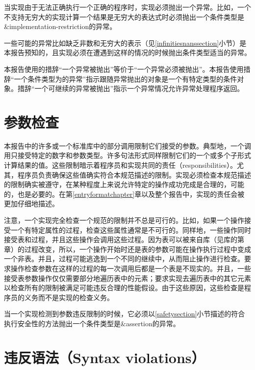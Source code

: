 当实现由于无法正确执行一个正确的程序时，实现必须抛出一个异常。比如，一个不支持无穷大的实现计算一个结果是无穷大的表达式时必须抛出一个条件类型是{\cf\&implementation-restriction}的异常。

一些可能的异常比如缺乏非数和无穷大的表示（见\ref{infinitiesnanssection}小节）是本报告预知的，且实现必须在遭遇到这样的情况的时候抛出条件类型适当的异常。

本报告使用的措辞“一个异常被抛出”等价于“一个异常必须被抛出”。本报告使用措辞“一个条件类型为的异常”指示跟随异常抛出的对象是一个有特定类型的条件对象。措辞“一个可继续的异常被抛出”指示一个异常情况允许异常处理程序返回。

\section{参数检查}
\label{argumentcheckingsection}

本报告中的许多或一个标准库中的部分调用限制它们接受的参数。典型地，一个调用只接受特定的数字和参数类型。许多句法形式同样限制它们的一个或多个子形式计算结果的值。这些限制暗示着程序员和实现共同的责任（responsibilities）。尤其，程序员负责确保这些值确实符合本规范描述的限制。实现必须检查本规范描述的限制确实被遵守，在某种程度上来说允许特定的操作成功完成是合理的，可能的，也是必要的。在第\ref{entryformatchapter}章以及整个报告中，实现的责任会被更加仔细地描述。

注意，一个实现完全检查一个规范的限制并不总是可行的。比如，如果一个操作接受一个有特定属性的过程，检查这些属性通常是不可行的。同样地，一些操作同时接受表和过程，并且这些操作会调用这些过程。因为表可以被来自库（见库的第章）的过程改变，所以，一个操作开始时还是表的参数可能在操作执行过程中变成一个非表。并且，过程可能逃逸到一个不同的继续中，从而阻止操作进行检查。要求操作检查参数在这样的过程的每一次调用后都是一个表是不现实的。并且，一些接受表参数操作仅仅需要部分地遍历表中的元素；要求实现去遍历表中的其它元素以检查所有的限制被满足可能违反合理的性能假设。由于这些原因，这些检查是程序员的义务而不是实现的检查义务。

当一个实现检测到参数违反限制的时候，它必须以\ref{safetysection}小节描述的符合执行安全性的方法抛出一个条件类型是{\cf\&assertion}的异常。

\section{违反语法（Syntax violations）}

